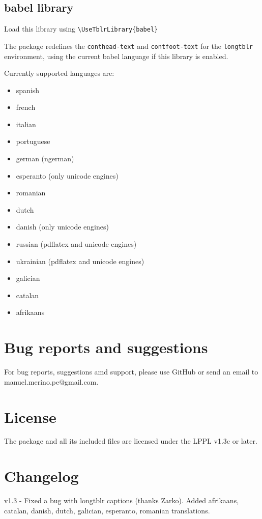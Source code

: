 \documentclass[a4paper,11pt]{article}
\begin{document}
	\subsection{babel library}
	Load this library using \verb|\UseTblrLibrary{babel}|

	The \tblrextras{} package redefines the \texttt{conthead-text} and \texttt{contfoot-text} for the \texttt{longtblr} environment, using the current babel language if this library is enabled.

	Currently supported languages are:

	\begin{itemize}
		\item spanish
		\item french
		\item italian
		\item portuguese
		\item german (ngerman)
		\item esperanto (only unicode engines)
		\item romanian
		\item dutch
		\item danish (only unicode engines)
		\item russian (pdflatex and unicode engines)
		\item ukrainian (pdflatex and unicode engines)
		\item galician
		\item catalan
		\item afrikaans
	\end{itemize}

	\section{Bug reports and suggestions}

	For bug reports, suggestions amd support, please use GitHub or send an email to manuel.merino.pe@gmail.com.

	\section{License}

	The \tblrextras{} package and all its included files are licensed under the LPPL v1.3c or later.

	\section{Changelog}
	 v1.3 - Fixed a bug with longtblr captions (thanks Zarko). Added afrikaans, catalan, danish, dutch, galician, esperanto, romanian translations.
\end{document}
